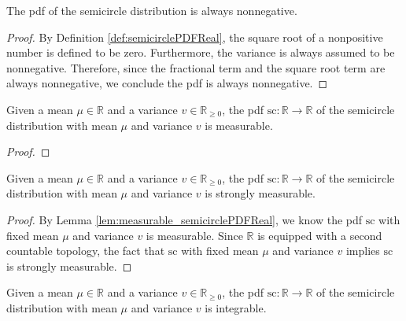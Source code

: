 \begin{lemma}\label{lem:semicirclePDFReal_nonneg}
    \leanok
    The pdf of the semicircle distribution is always nonnegative.
\end{lemma}
\begin{proof}
  \leanok
   By Definition \ref{def:semicirclePDFReal}, the square root of a nonpositive number is defined to be zero.
   Furthermore, the variance is always assumed to be nonnegative.
   Therefore, since the fractional term and the square root term are always nonnegative,
   we conclude the pdf is always nonnegative.
\end{proof}
\begin{lemma}\label{lem:measurable_semicirclePDFReal}
    \leanok
    \uses{}
    Given a mean $\mu \in \mathbb{R}$ and a variance $v \in \mathbb{R}_{\geq 0}$, the pdf $\mathrm{sc} : \mathbb{R} \rightarrow \mathbb{R}$
    of the semicircle distribution with mean $\mu$ and variance $v$ is measurable.
\end{lemma}
\begin{proof}
  \leanok
\end{proof}
\begin{lemma}\label{lem:stronglyMeasurable_semicirclePDFReal}
    \leanok
    Given a mean $\mu \in \mathbb{R}$ and a variance $v \in \mathbb{R}_{\geq 0}$, the pdf $\mathrm{sc} : \mathbb{R} \rightarrow \mathbb{R}$
    of the semicircle distribution with mean $\mu$ and variance $v$ is strongly measurable.
\end{lemma}
\begin{proof}
  \leanok
    By Lemma \ref{lem:measurable_semicirclePDFReal}, we know the pdf $\mathrm{sc}$ with fixed mean $\mu$ and variance $v$ is measurable.
    Since $\mathbb{R}$ is equipped with a second countable topology, the fact that $\mathrm{sc}$ with fixed mean $\mu$ and variance $v$ implies $\mathrm{sc}$ is strongly measurable.
\end{proof}
\begin{lemma}\label{lem:integrable_semicirclePDFReal}
    \leanok
    Given a mean $\mu \in \mathbb{R}$ and a variance $v \in \mathbb{R}_{\geq 0}$, the pdf $\mathrm{sc} : \mathbb{R} \rightarrow \mathbb{R}$
    of the semicircle distribution with mean $\mu$ and variance $v$ is integrable.
\end{lemma}
